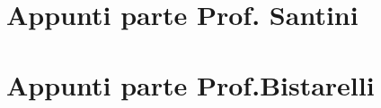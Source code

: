 \documentclass[a4paper,12 pt]{report}
\theoremstyle{definition}
\theoremstyle{remark}
\begin{document}
    
     \tableofcontents
    \newpage
    
    \newpage
    
    \part{Appunti parte Prof. Santini}
    
    
    
    
    
    \part{Appunti parte Prof.Bistarelli}
    
    
    \newpage
    
    
\end{document}
